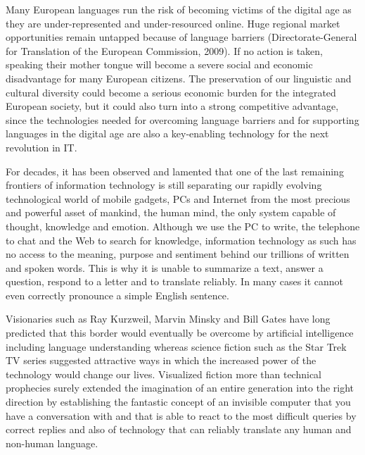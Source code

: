 \documentclass[10pt, plain]{../../metanetpaper}
\begin{document}


\begin{multicols}{2}
Many European languages run the risk of becoming victims of the digital age as they are under-represented and under-resourced online. Huge regional market opportunities remain untapped because of language barriers (Directorate-General for Translation of the European Commission, 2009). If no action is taken, speaking their mother tongue will become a severe social and economic disadvantage for many European citizens. The preservation of our linguistic and cultural diversity could become a serious economic burden for the integrated European society, but it could also turn into a strong competitive advantage, since the technologies needed for overcoming language barriers and for supporting languages in the digital age are also a key-enabling technology for the next revolution in IT. 

For decades, it has been observed and lamented that one of the last remaining frontiers of information technology is still separating our rapidly evolving technological world of mobile gadgets, PCs and Internet from the most precious and powerful asset of mankind, the human mind, the only system capable of thought, knowledge and emotion. Although we use the PC to write, the telephone to chat and the Web to search for knowledge, information technology as such has no access to the meaning, purpose and sentiment behind our trillions of written and spoken words. This is why it is unable to summarize a text, answer a question, respond to a letter and to translate reliably. In many cases it cannot even correctly pronounce a simple English sentence.   

Visionaries such as Ray Kurzweil, Marvin Minsky and Bill Gates have long predicted that this border would eventually be overcome by artificial intelligence including language understanding whereas science fiction such as the Star Trek TV series suggested attractive ways in which the increased power of the technology would change our lives. Visualized fiction more than technical prophecies surely extended the imagination of an entire generation into the right direction by establishing the fantastic concept of an invisible computer that you have a conversation with and that is able to react to the most difficult queries by correct replies and also of technology that can reliably translate any human and non-human language.


\end{multicols}
\end{document}
